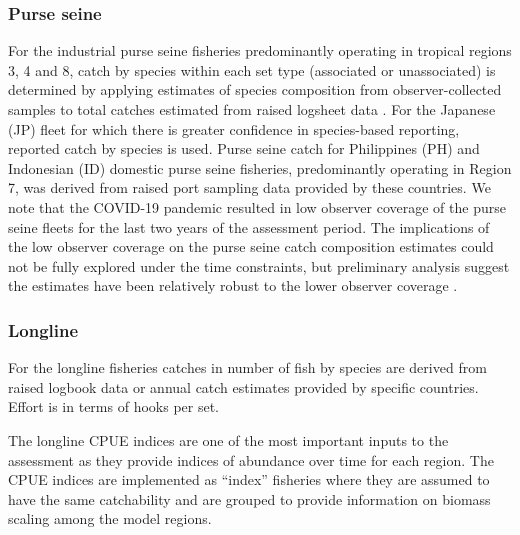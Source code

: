 \subsubsection{Purse seine}
\label{sec:catch_effort_PS}

For the industrial purse seine fisheries predominantly operating in tropical regions 3, 4 and 8, catch by species within each set type (associated or unassociated) is determined by applying estimates of species composition from observer-collected samples to total catches estimated from raised logsheet data \citep{hampton_annual_2016,peatman_project_2021,peatman_project_2023}. For the Japanese (JP) fleet for which there is greater confidence in species-based reporting, reported catch by species is used. Purse seine catch for Philippines (PH) and Indonesian (ID) domestic purse seine fisheries, predominantly operating in Region 7, was derived from raised port sampling data provided by these countries. We note that the COVID-19 pandemic resulted in low observer coverage of the purse seine fleets for the last two years of the assessment period. The implications of the low observer coverage on the purse seine catch composition estimates could not be fully explored under the time constraints, but preliminary analysis suggest the estimates have been relatively robust to the lower observer coverage \citep{hamer_report_2023}.

\subsubsection{Longline}
\label{sec:catch_effort_LL}

For the longline fisheries catches in number of fish by species are derived from raised logbook data or annual catch estimates provided by specific countries. Effort is in terms of hooks per set.

The longline CPUE indices are one of the most important inputs to the assessment as they provide indices of abundance over time for each region. The CPUE indices are implemented as \enquote{index} fisheries where they are assumed to have the same catchability and are grouped to provide information on biomass scaling among the model regions.

